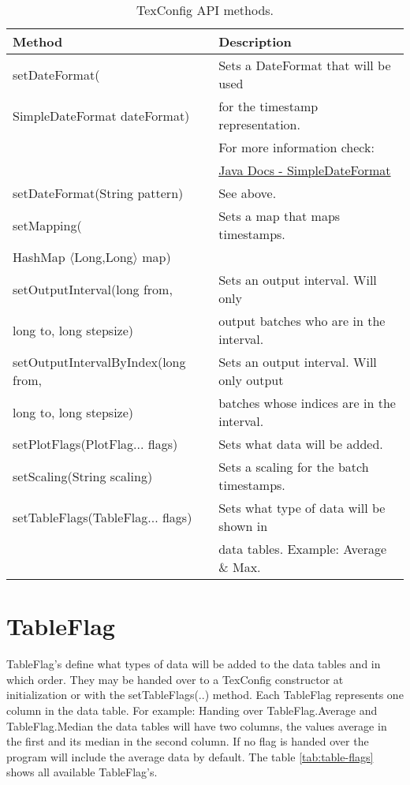 \begin{table}[h]
\centering
\begin{tabular}[h]{|l|l|}\hline
	\textbf{Method} & \textbf{Description}\\
	\hline
	setDateFormat( & Sets a DateFormat that will be used\\
	SimpleDateFormat dateFormat) & for the timestamp representation.\\
	& For more information check:\\
	& \href{http://docs.oracle.com/javase/6/docs/api/java/text/SimpleDateFormat.html}{Java Docs - SimpleDateFormat}\\
	\hline
	setDateFormat(String pattern) & See above.\\
	\hline
	setMapping( & Sets a map that maps timestamps.\\
	HashMap $\langle$Long,Long$\rangle$ map) &\\
	\hline
	setOutputInterval(long from,& Sets an output interval. Will only\\
	long to, long stepsize) & output batches who are in the interval.\\
	\hline
	setOutputIntervalByIndex(long from,& Sets an output interval. Will only output\\
	long to, long stepsize) & batches whose indices are in the interval.\\
	\hline
	setPlotFlags(PlotFlag... flags) & Sets what data will be added.\\
	\hline
	setScaling(String scaling) & Sets a scaling for the batch timestamps.\\
	\hline
	setTableFlags(TableFlag... flags) & Sets what type of data will be shown in\\
	& data tables. Example: Average \& Max.\\
	\hline
\end{tabular}
\caption{TexConfig API methods.}
\label{tab:tex-methods}
\end{table}

\section{TableFlag}
TableFlag's define what types of data will be added to the data tables and in which order. They may be handed over to a TexConfig constructor at initialization or with the setTableFlags(..) method. Each TableFlag represents one column in the data table. For example: Handing over TableFlag.Average and TableFlag.Median the data tables will have two columns, the values average in the first and its median in the second column. If no flag is handed over the program will include the average data by default. The table \ref{tab:table-flags} shows all available TableFlag's.

